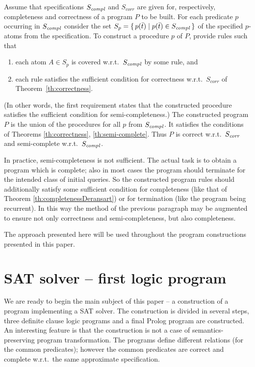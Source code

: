 \documentclass{tlp}
\begin{document}
Assume that specifications $S_{\it c o m p l}$ and $S_{corr}$ are given 
for, respectively, completeness and correctness of a program $P$ to be built. 
For each predicate $p$ occurring in $S_{\it c o m p l}$ consider the set
$S_p = \{\, p(\bar t)   \mid p(\bar t) \in S_{\it c o m p l} \,\}$
of the specified $p$-atoms from the specification.
To construct a procedure $p$ of $P$, provide rules such that
\begin{enumerate}
\item 
\label{requirement1}
  each atom $A\in S_p$ is covered w.r.t.\ $S_{\it c o m p l}$ by some rule, and
\item
  each rule satisfies the sufficient condition for correctness
  w.r.t.\ $S_{corr}$ of Theorem~\ref{th:correctness}.
\end{enumerate}
(In other words, the first requirement states that the constructed procedure
{satisfies the sufficient condition for semi-completeness}.)
The constructed program $P$ is the union of the procedures for all $p$ from
$S_{\it c o m p l}$.  
It satisfies the conditions of Theorems \ref{th:correctness},
\ref{th:semi-complete}.  Thus $P$ is correct w.r.t.\ $S_{\it corr}$ and
semi-complete w.r.t.\ $S_{\it c o m p l}$.

In practice, semi-completeness is not sufficient.  The actual task is 
to obtain a program which is complete;  also in most cases the program should
terminate for the intended class of initial queries.   
So the constructed program rules
should additionally satisfy some sufficient condition
for completeness (like that of Theorem \ref{th:completenessDeransart}) or
for termination
(like the program being recurrent).
In this way the method of the previous paragraph may be augmented to ensure
not only correctness and semi-completeness, but also completeness. 


The approach presented here will be used throughout the program constructions
presented in this paper. 



\section{SAT solver -- first logic program}
\label{sec:logicProgram1}

We are ready to begin the main subject of this paper -- a construction of a
program implementing a SAT solver.
The construction is divided in several steps, three definite clause logic
programs and a final Prolog program are constructed.
An interesting feature is that the construction is not a case of
semantics-preserving program transformation. 
The programs define different relations (for
the common predicates); however the common predicates are correct and
complete w.r.t.\ the same approximate specification.
\end{document}
